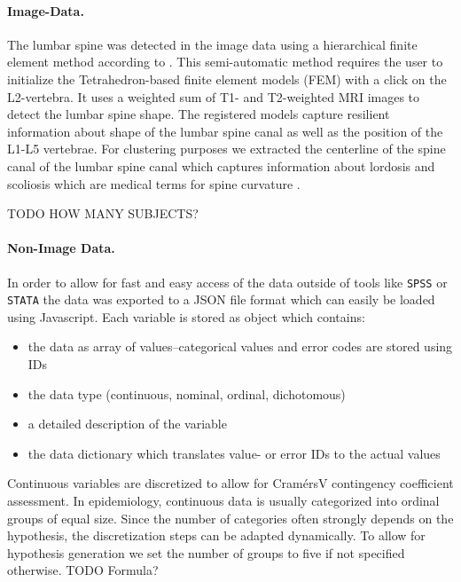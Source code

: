 \documentclass[journal]{style/vgtc} 			          %
\begin{document}
\paragraph{Image-Data.} \label{Image-Data}
The lumbar spine was detected in the image data using a hierarchical finite element method according to \cite{Rak2013}.
%
This semi-automatic method requires the user to initialize the Tetrahedron-based finite element models (FEM) with a click on the L2-vertebra.
%
It uses a weighted sum of T1- and T2-weighted MRI images to detect the lumbar spine shape.
%
The registered models capture resilient information about shape of the lumbar spine canal as well as the position of the L1-L5 vertebrae.
%
For clustering purposes we extracted the centerline of the spine canal of the lumbar spine canal which captures information about lordosis and scoliosis which are medical terms for spine curvature \cite{Klemm2013VMV}.

TODO HOW MANY SUBJECTS?

\paragraph{Non-Image Data.} 

In order to allow for fast and easy access of the data outside of tools like \texttt{SPSS} or \texttt{STATA} the data was exported to a JSON file format which can easily be loaded using Javascript.
%
Each variable is stored as object which contains: 
\begin{itemize}
	\item the data as array of values--categorical values and error codes are stored using IDs
	\item the data type (continuous, nominal, ordinal, dichotomous)
	\item a detailed description of the variable
	\item the data dictionary which translates value- or error IDs to the actual values
\end{itemize}
%
Continuous variables are discretized to allow for CramérsV contingency coefficient assessment.
%
In epidemiology, continuous data is usually categorized into ordinal groups of equal size.
%
Since the number of categories often strongly depends on the hypothesis, the discretization steps can be adapted dynamically.
%
To allow for hypothesis generation we set the number of groups to five if not specified otherwise.
TODO Formula?
\end{document}
